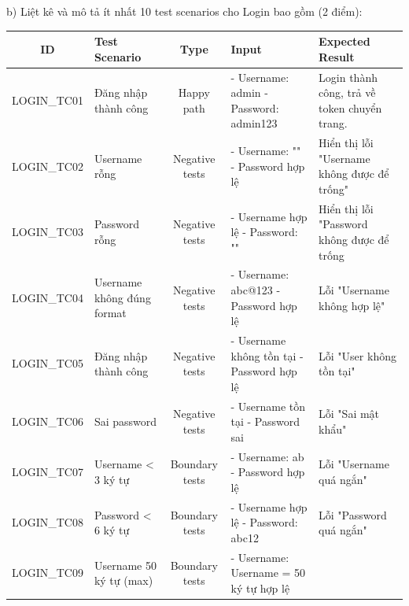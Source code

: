 \documentclass[a4paper,12pt]{article}
\begin{document}

b) Liệt kê và mô tả ít nhất 10 test scenarios cho Login bao gồm (2 điểm):
\begin{table}[H]
\centering
\begin{tabularx}{\textwidth}{|c|>{\raggedright\arraybackslash}X|c|>{\raggedright\arraybackslash}X|>{\raggedright\arraybackslash}X|}
\hline
\textbf{ID} & \textbf{Test Scenario} & \textbf{Type} & \textbf{Input} & \textbf{Expected Result} \\ \hline

LOGIN\_TC01 & Đăng nhập thành công & Happy path &
- Username: admin \newline
- Password: admin123  & Login thành công, trả về token chuyển trang. \\
\hline
LOGIN\_TC02 & Username rỗng & Negative tests &
- Username: "" \newline
- Password hợp lệ  & Hiển thị lỗi "Username không được để trống" \\
\hline
LOGIN\_TC03 & Password rỗng & Negative tests &
- Username hợp lệ \newline
- Password: ""  & Hiển thị lỗi "Password không được để trống \\
\hline
LOGIN\_TC04 & Username không đúng format & Negative tests &
- Username: abc@123 \newline
- Password hợp lệ  & Lỗi "Username không hợp lệ" \\
\hline
LOGIN\_TC05 & Đăng nhập thành công & Negative tests &
- Username không tồn tại \newline
- Password hợp lệ  & Lỗi "User không tồn tại" \\
\hline
LOGIN\_TC06 & Sai password & Negative tests &
- Username tồn tại \newline
- Password sai & Lỗi "Sai mật khẩu" \\
\hline
LOGIN\_TC07 & Username < 3 ký tự & Boundary tests &
- Username: ab \newline
- Password hợp lệ  & Lỗi "Username quá ngắn" \\
\hline
LOGIN\_TC08 & Password < 6 ký tự & Boundary tests &
- Username hợp lệ \newline
- Password: abc12  & Lỗi "Password quá ngắn" \\
\hline
LOGIN\_TC09 & Username 50 ký tự (max) & Boundary tests &
- Username: Username = 50 ký tự hợp lệ \newline

\end{tabularx}
\end{table}
\end{document}
